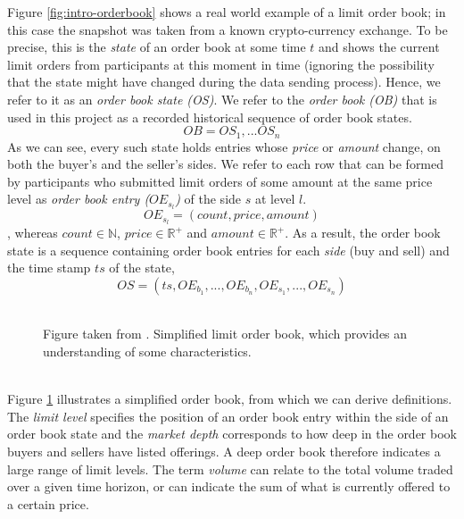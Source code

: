 Figure \ref{fig:intro-orderbook} shows a real world example of a limit order book; in this case the snapshot was taken from a known crypto-currency exchange.
To be precise, this is the \textit{state} of an order book at some time $t$ and shows the current limit orders from participants at this moment in time (ignoring the possibility that the state might have changed during the data sending process). 
Hence, we refer to it as an \textit{order book state (OS)}.
We refer to the \textit{order book (OB)} that is used in this project as a recorded historical sequence of order book states.
\begin{equation}\label{eq:order-book}
OB=OS_1, ... OS_n
\end{equation}
As we can see, every such state holds entries whose \textit{price} or \textit{amount} change, on both the buyer's and the seller's sides.
We refer to each row that can be formed by participants who submitted limit orders of some amount at the same price level as \textit{order book entry ($OE_{s_l}$)} of the side $s$ at level $l$.
\begin{equation}\label{eq:order-book-entry}
OE_{s_l}=(count, price, amount)
\end{equation}
, whereas $count \in \mathbb{N}$, $price \in \mathbb{R^+}$ and $amount \in \mathbb{R^+}$.
As a result, the order book state is a sequence containing order book entries for each \textit{side} (buy and sell) and the time stamp $ts$ of the state,
\begin{equation}\label{eq:order-book-state}
OS=(ts, OE_{b_1}, ..., OE_{b_n}, OE_{s_1}, ..., OE_{s_n})
\end{equation}
\\
\begin{figure}[H]
    \centering
    \caption{Figure taken from \cite{miranda}. Simplified limit order book, which provides an understanding of some characteristics.}
    \label{fig:orderbook-simple}
\end{figure}
\hfill
\\
Figure \ref{fig:orderbook-simple} illustrates a simplified order book, from which we can derive definitions.
The \textit{limit level} specifies the position of an order book entry within the side of an order book state and the \textit{market depth} corresponds to how deep in the order book buyers and sellers have listed offerings.
A deep order book therefore indicates a large range of limit levels.
The term \textit{volume} can relate to the total volume traded over a given time horizon, or can indicate the sum of what is currently offered to a certain price.
